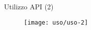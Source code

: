 %
\begin{frame}[t]{Utilizzo API (2)}
\begin{figure}
\centering
	\texttt{[image: uso/uso-2]}
	\label{fig:esempio-uso}
\end{figure}
\end{frame}
%
